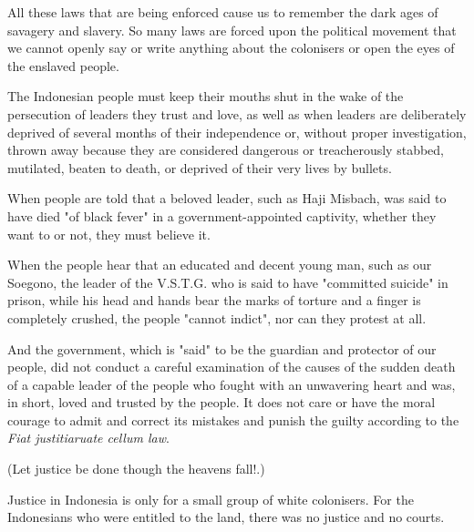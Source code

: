 All these laws that are being enforced cause us to remember the dark ages of 
savagery and slavery. So many laws are forced upon the political movement that 
we cannot openly say or write anything about the colonisers or open the eyes of the enslaved people.\vskip 0.2in

The Indonesian people must keep their mouths shut in the wake of the persecution 
of leaders they trust and love, as well as when leaders are deliberately deprived 
of several months of their independence or, without proper investigation, thrown 
away because they are considered dangerous or treacherously stabbed, mutilated, 
beaten to death, or deprived of their very lives by bullets.\vskip 0.2in

When people are told that a beloved leader, such as Haji Misbach, was said to 
have died "of black fever" in a government-appointed captivity, whether they want to or not, they must believe it.\vskip 0.2in

When the people hear that an educated and decent young man, such as our Soegono, the leader 
of the V.S.T.G. who is said to have "committed suicide" in prison, while his head and hands 
bear the marks of torture and a finger is completely crushed, the people "cannot indict", nor can they protest at all.\vskip 0.2in

And the government, which is "said" to be the guardian and protector of 
our people, did not conduct a careful examination of the causes of the 
sudden death of a capable leader of the people who fought with an unwavering 
heart and was, in short, loved and trusted by the people. It does not care or 
have the moral courage to admit and correct its mistakes and punish the guilty according to the \emph{Fiat justitiaruate cellum law}.\vskip 0.2in

(Let justice be done though the heavens fall!.)

Justice in Indonesia is only for a small group of white colonisers. For the Indonesians who were entitled to the land, there was no justice and no courts.\vskip 0.2in